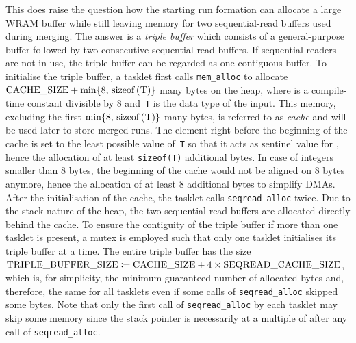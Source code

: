 This does raise the question how the starting run formation can allocate a large WRAM buffer while still leaving memory for two sequential-read buffers used during merging.
The answer is a \emph{triple buffer} which consists of a general-purpose buffer followed by two consecutive sequential-read buffers.
If sequential readers are not in use, the triple buffer can be regarded as one contiguous buffer.
To initialise the triple buffer, a tasklet first calls \lstinline|mem_alloc| to allocate \(\cachesize{} + \min\braces{ 8, \text{\lstinline[keywords={}]|sizeof(T)|} }\) many bytes on the heap, where \cachesize{} is a compile-time constant divisible by 8 and~\lstinline|T| is the data type of the input.
This memory, excluding the first \(\min\braces{ 8, \text{\lstinline[keywords={}]|sizeof(T)|} }\) many bytes, is referred to as \emph{cache} and will be used later to store merged runs.
The element right before the beginning of the cache is set to the least possible value of~\lstinline|T| so that it acts as sentinel value for \IS{}, hence the allocation of at least \lstinline[keywords={}]|sizeof(T)| additional bytes.
In case of integers smaller than 8 bytes, the beginning of the cache would not be aligned on 8 bytes anymore, hence the allocation of at least 8 additional bytes to simplify DMAs.
After the initialisation of the cache, the tasklet calls \lstinline|seqread_alloc| twice.
Due to the stack nature of the heap, the two sequential-read buffers are allocated directly behind the cache.
To ensure the contiguity of the triple buffer if more than one tasklet is present, a mutex is employed such that only one tasklet initialises its triple buffer at a time.
The entire triple buffer has the size \(\triplebuffersize \coloneqq \cachesize{} + 4 \times \seqreadcachesize{}\), which is, for simplicity, the minimum guaranteed number of allocated bytes and, therefore, the same for all tasklets even if some calls of \lstinline|seqread_alloc| skipped some bytes.
Note that only the first call of \lstinline|seqread_alloc| by each tasklet may skip some memory since the stack pointer is necessarily at a multiple of \seqreadcachesize{} after any call of \lstinline|seqread_alloc|.

